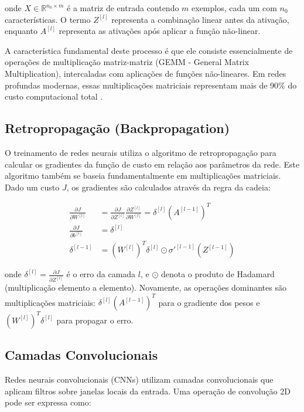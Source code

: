 \documentclass[12pt,a4paper]{article}
\begin{document}
onde $X \in \mathbb{R}^{n_0 \times m}$ é a matriz de entrada contendo $m$ exemplos, cada um com $n_0$ características. O termo $Z^{[l]}$ representa a combinação linear antes da ativação, enquanto $A^{[l]}$ representa as ativações após aplicar a função não-linear.

A característica fundamental deste processo é que ele consiste essencialmente de operações de multiplicação matriz-matriz (GEMM - General Matrix Multiplication), intercaladas com aplicações de funções não-lineares. Em redes profundas modernas, essas multiplicações matriciais representam mais de 90\% do custo computacional total \cite{jouppi_tpu_paper_2017}.

\subsection{Retropropagação (Backpropagation)}

O treinamento de redes neurais utiliza o algoritmo de retropropagação para calcular os gradientes da função de custo em relação aos parâmetros da rede. Este algoritmo também se baseia fundamentalmente em multiplicações matriciais. Dado um custo $J$, os gradientes são calculados através da regra da cadeia:

\begin{align}
\frac{\partial J}{\partial W^{[l]}} &= \frac{\partial J}{\partial Z^{[l]}} \frac{\partial Z^{[l]}}{\partial W^{[l]}} = \delta^{[l]} (A^{[l-1]})^T \\
\frac{\partial J}{\partial b^{[l]}} &= \delta^{[l]} \\
\delta^{[l-1]} &= (W^{[l]})^T \delta^{[l]} \odot \sigma'^{[l-1]}(Z^{[l-1]})
\end{align}

onde $\delta^{[l]} = \frac{\partial J}{\partial Z^{[l]}}$ é o erro da camada $l$, e $\odot$ denota o produto de Hadamard (multiplicação elemento a elemento). Novamente, as operações dominantes são multiplicações matriciais: $\delta^{[l]} (A^{[l-1]})^T$ para o gradiente dos pesos e $(W^{[l]})^T \delta^{[l]}$ para propagar o erro.

\subsection{Camadas Convolucionais}

Redes neurais convolucionais (CNNs) utilizam camadas convolucionais que aplicam filtros sobre janelas locais da entrada. Uma operação de convolução 2D pode ser expressa como:
\end{document}
